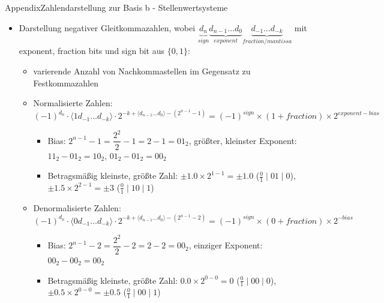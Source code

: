 \begin{frame}[allowframebreaks]{Appendix}{Zahlendarstellung zur Basis b - Stellenwertsysteme\vspace{0.5cm}}
\begin{itemize}
\begin{Sidenote}
\begin{itemize}
\begin{align*}
        \end{align*}
    \end{itemize}
  \end{Sidenote}
  \item Darstellung \alert{negativer Gleitkommazahlen}, wobei $\underbrace{d_n}_{sign} \underbrace{d_{n-1} \ldots d_0}_{exponent} \underbrace{d_{-1}\ldots d_{-k}}_{fraction / mantissa}$ mit exponent, fraction bits und sign bit aus $\{0, 1\}$:
  \begin{itemize}
      \item \alert{varierende Anzahl von Nachkommastellen} im Gegensatz zu Festkommazahlen
      \item \alert{Normalisierte Zahlen:} $(-1)^{d_n} \cdot \langle 1 d_{-1}\ldots d_{-k}\rangle \cdot 2^{-k+\langle d_{n-1}\ldots d_{0}\rangle-(2^{n-1}-1)} = (-1)^{sign} \times (1 + fraction) \times 2^{exponent - bias}$
      \begin{itemize}
        \item \alert{Bias:} $2^{n-1} - 1 = \dfrac{2^2}{2} - 1 = 2 - 1 = \boxed{01_{2}}$, \alert{größter, kleinster Exponent:} $11_2 - 01_2 = \boxed{10_2}$, $01_2 - 01_2 = \boxed{00_2}$
        \item \alert{Betragsmäßig kleinste, größte Zahl:} $\pm 1.0\times 2^{1-1} =\pm 1.0$ ($\boxed{\frac{0}{1}\mid 01\mid 0}$), $\pm 1.5 \times 2^{2-1} =\pm 3$ ($\boxed{\frac{0}{1}\mid 10\mid 1}$)
      \end{itemize}
      \item \alert{Denormalisierte Zahlen:} $(-1)^{d_n} \cdot \langle 0 d_{-1}\ldots d_{-k}\rangle \cdot 2^{-k+\langle d_{n-1}\ldots d_{0}\rangle-(2^{n-1}-2)} = (-1)^{sign} \times (0 + fraction) \times 2^{-bias}$
      \begin{itemize}
        \item \alert{Bias:} $2^{n-1} - 2 = \dfrac{2^2}{2} - 2 = 2 - 2 = \boxed{00_{2}}$, \alert{einziger Exponent:} $00_2 - 00_2 = \boxed{00_2}$
        \item \alert{Betragsmäßig kleinste, größte Zahl:} $0.0 \times 2^{0-0} = 0$ ($\boxed{\frac{0}{1}\mid 00\mid 0}$), $\pm 0.5 \times 2^{0-0} =\pm 0.5$ ($\boxed{\frac{0}{1}\mid 00\mid 1}$)

\end{itemize}
\end{itemize}
\end{itemize}
\end{frame}
